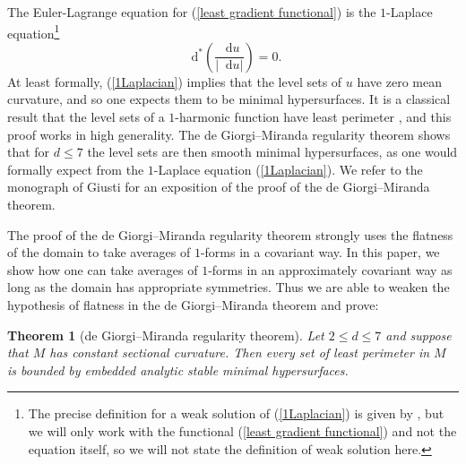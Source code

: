 \documentclass[reqno,11pt]{amsart}
\newcommand*\dif{\mathop{}\!\mathrm{d}}
\newtheorem{theorem}{Theorem}[section]
\theoremstyle{definition}
\numberwithin{equation}{section}
\begin{document}
The Euler-Lagrange equation for (\ref{least gradient functional}) is the $1$-Laplace equation\footnote{The precise definition for a weak solution of (\ref{1Laplacian}) is given by \cite{Mazon14}, but we will only work with the functional (\ref{least gradient functional}) and not the equation itself, so we will not state the definition of weak solution here.}
\begin{equation}\label{1Laplacian}
\dif^* \left(\frac{\dif u}{|\dif u|}\right) = 0.
\end{equation}
At least formally, (\ref{1Laplacian}) implies that the level sets of $u$ have zero mean curvature, and so one expects them to be minimal hypersurfaces.
It is a classical result that the level sets of a $1$-harmonic function have least perimeter \cite{BOMBIERI1969}, and this proof works in high generality.
The de Giorgi--Miranda regularity theorem \cite{deGiorgi61, Miranda66} shows that for $d \leq 7$ the level sets are then smooth minimal hypersurfaces, as one would formally expect from the $1$-Laplace equation (\ref{1Laplacian}).
We refer to the monograph of Giusti \cite[Part 1]{Giusti77} for an exposition of the proof of the de Giorgi--Miranda theorem.

The proof of the de Giorgi--Miranda regularity theorem strongly uses the flatness of the domain to take averages of $1$-forms in a covariant way.
In this paper, we show how one can take averages of $1$-forms in an approximately covariant way as long as the domain has appropriate symmetries.
Thus we are able to weaken the hypothesis of flatness in the de Giorgi--Miranda theorem and prove:

\begin{theorem}[de Giorgi--Miranda regularity theorem]\label{main lma}
Let $2 \leq d \leq 7$ and suppose that $M$ has constant sectional curvature.
Then every set of least perimeter in $M$ is bounded by embedded analytic stable minimal hypersurfaces.
\end{theorem}

\end{document}
